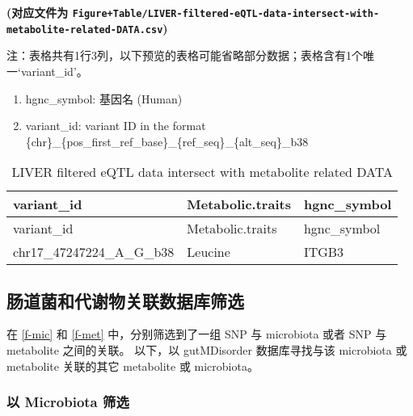 \documentclass[
]{article}
\providecommand{\tightlist}{%
  \setlength{\itemsep}{0pt}\setlength{\parskip}{0pt}}
\begin{document}
\textbf{(对应文件为 \texttt{Figure+Table/LIVER-filtered-eQTL-data-intersect-with-metabolite-related-DATA.csv})}

\begin{center}\begin{tcolorbox}[colback=gray!10, colframe=gray!50, width=0.9\linewidth, arc=1mm, boxrule=0.5pt]注：表格共有1行3列，以下预览的表格可能省略部分数据；表格含有1个唯一`variant\_id'。
\end{tcolorbox}
\end{center}
\begin{center}\begin{tcolorbox}[colback=gray!10, colframe=gray!50, width=0.9\linewidth, arc=1mm, boxrule=0.5pt]\begin{enumerate}\tightlist
\item hgnc\_symbol:  基因名 (Human)
\item variant\_id:  variant ID in the format \{chr\}\_\{pos\_first\_ref\_base\}\_\{ref\_seq\}\_\{alt\_seq\}\_b38
\end{enumerate}\end{tcolorbox}
\end{center}

\begin{longtable}[]{@{}lll@{}}
\caption{\label{tab:LIVER-filtered-eQTL-data-intersect-with-metabolite-related-DATA}LIVER filtered eQTL data intersect with metabolite related DATA}\tabularnewline
\toprule
variant\_id & Metabolic.traits & hgnc\_symbol\tabularnewline
\midrule
\endfirsthead
\toprule
variant\_id & Metabolic.traits & hgnc\_symbol\tabularnewline
\midrule
\endhead
chr17\_47247224\_A\_G\_b38 & Leucine & ITGB3\tabularnewline
\bottomrule
\end{longtable}

\hypertarget{ux80a0ux9053ux83ccux548cux4ee3ux8c22ux7269ux5173ux8054ux6570ux636eux5e93ux7b5bux9009}{%
\subsection{肠道菌和代谢物关联数据库筛选}\label{ux80a0ux9053ux83ccux548cux4ee3ux8c22ux7269ux5173ux8054ux6570ux636eux5e93ux7b5bux9009}}

在 \ref{f-mic} 和 \ref{f-met} 中，分别筛选到了一组 SNP 与 microbiota 或者 SNP 与 metabolite 之间的关联。
以下，以 gutMDisorder 数据库寻找与该 microbiota 或 metabolite 关联的其它 metabolite 或 microbiota。

\hypertarget{ux4ee5-microbiota-ux7b5bux9009}{%
\subsubsection{以 Microbiota 筛选}\label{ux4ee5-microbiota-ux7b5bux9009}}
\end{document}
